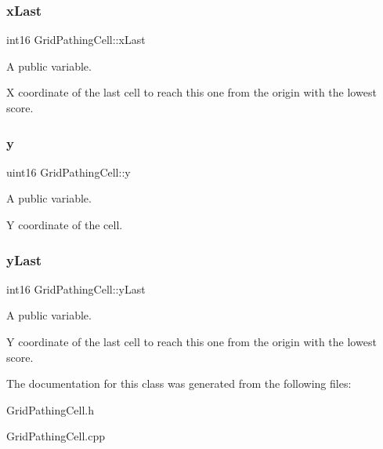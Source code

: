 \subsubsection{\texorpdfstring{x\+Last}{xLast}}
{\footnotesize\ttfamily int16 Grid\+Pathing\+Cell\+::x\+Last}



A public variable. 

X coordinate of the last cell to reach this one from the origin with the lowest score. \hypertarget{class_grid_pathing_cell_a32de04e3614f2e37622a281fdbc24d66}{}\label{class_grid_pathing_cell_a32de04e3614f2e37622a281fdbc24d66} 
\subsubsection{\texorpdfstring{y}{y}}
{\footnotesize\ttfamily uint16 Grid\+Pathing\+Cell\+::y}



A public variable. 

Y coordinate of the cell. \hypertarget{class_grid_pathing_cell_a3a1c2724f3308954f52f77c09d7d6d62}{}\label{class_grid_pathing_cell_a3a1c2724f3308954f52f77c09d7d6d62} 
\subsubsection{\texorpdfstring{y\+Last}{yLast}}
{\footnotesize\ttfamily int16 Grid\+Pathing\+Cell\+::y\+Last}



A public variable. 

Y coordinate of the last cell to reach this one from the origin with the lowest score. 

The documentation for this class was generated from the following files\+:\begin{DoxyCompactItemize}
\item 
Grid\+Pathing\+Cell.\+h\item 
Grid\+Pathing\+Cell.\+cpp\end{DoxyCompactItemize}

